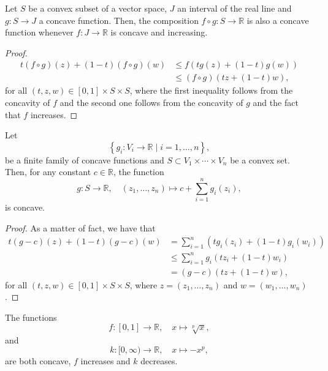 \begin{lemma}\label{lemma:concavity-of-compositions-of-concave-functions}
  Let \(S\) be a convex subset of a vector space, \(J\) an interval of the real
  line and \(g:S\to{J}\) a concave function. Then, the composition
  \(f\circ{g}:S\to\mathbb{R}\) is also a concave function whenever \(f:J\to\mathbb{R}\)
  is concave and increasing.
\end{lemma}

\begin{proof}
  \begin{align*}
    t(f\circ{g})(z)+(1-t)(f\circ{g})(w)
    &\leqslant{f(tg(z)+(1-t)g(w))}\\
    &\leqslant{(f\circ{g})(tz+(1-t)w)},
  \end{align*}
  for all \((t,z,w)\in{[0,1]\times{S}\times{S}}\), where the first inequality
  follows from the concavity of \(f\) and the second one follows from the
  concavity of \(g\) and the fact that \(f\) increases.
\end{proof}

\begin{lemma}\label{lemma:concavity-of-sums-of-concave-functions}
  Let
  \[
    \left\{g_{i}:V_{i}\to\mathbb{R}\mid{i=1,\ldots,n}\right\},
  \]
  be a finite family of concave functions and
  \(S\subset{V_{1}\times\cdots\times{V_{n}}}\) be a convex set. Then, for any
  constant \(c\in\mathbb{R}\), the function
  \[
    g:S\to\mathbb{R},\quad{(z_{1},\ldots,z_{n})\mapsto{c+\sum_{i=1}^{n}g_{i}(z_{i})}},
  \]
  is concave.
\end{lemma}

\begin{proof}
  As a matter of fact, we have that
  \begin{align*}
    t(g-c)(z)+(1-t)(g-c)(w)
    &=
    \sum_{i=1}^{n}\left(tg_{i}(z_{i})+(1-t)g_{i}(w_{i})\right)
    \\
    &\leqslant
    \sum_{i=1}^{n}g_{i}\left(tz_{i}+(1-t)w_{i}\right)
    \\
    &=
    (g-c)\left(tz+(1-t)w\right),
  \end{align*}
  for all \((t,z,w)\in{[0,1]\times{S}\times{S}}\), where
  \(z=(z_{1},\ldots,z_{n})\) and \(w=(w_{1},\ldots,w_{n})\).
\end{proof}

\begin{lemma}\label{lemma:two-concave-functions}
  The functions
  \begin{equation}\label{eq:f-function}
    f:[0,1]\to\mathbb{R},\quad{x\mapsto{\sqrt[p]{x}}},
  \end{equation}
  and
  \begin{equation}\label{eq:k-function}
    k:[0,\infty)\to\mathbb{R},\quad{x\mapsto{-x^{p}}},
  \end{equation}
  are both concave, \(f\) increases and \(k\) decreases.
\end{lemma}


